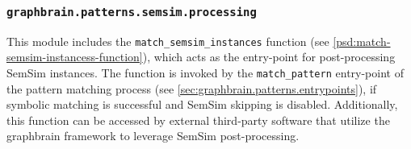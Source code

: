 \documentclass[11pt]{scrreprt}
\begin{document}
\subsubsection{\texttt{graphbrain.patterns.semsim.processing}}
\label{sec:graphbrain.patterns.semsim.processing}
This module includes the \texttt{match\_semsim\_instances} function (see \cref{psd:match-semsim-instancess-function}), which acts as the entry-point for post-processing SemSim instances. The function is invoked by the \texttt{match\_pattern} entry-point of the pattern matching process (see  \cref{sec:graphbrain.patterns.entrypoints}), if symbolic matching is successful and SemSim skipping is disabled. Additionally, this function can be accessed by external third-party software that utilize the graphbrain framework to leverage SemSim post-processing.
\end{document}
